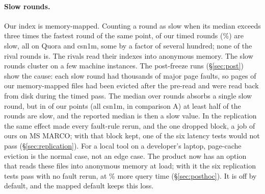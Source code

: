 \paragraph{Slow rounds.} Our index is memory-mapped. Counting a round as slow when its median exceeds
three times the fastest round of the same point,  of our  timed rounds
(\%) are slow, all on Quora and csn1m, some by a factor of several hundred; none of the
 rival rounds is. The rivals read their indexes into anonymous memory. The slow rounds
cluster on a few machine instances. The post-freeze runs (\S\ref{sec:post}) show the cause: each slow
round had thousands of major page faults, so pages of our memory-mapped files had been evicted after the
pre-read and were read back from disk during the timed pass. The median over rounds absorbs a single slow round, but in
 of our points (all csn1m, in comparison A) at least half of the rounds are slow, and the
reported median is then a slow value. In the replication the same effect made every fault-rule rerun, and
the one dropped block, a job of ours on MS MARCO; with that block kept, one of the six latency tests would not pass
(\S\ref{sec:replication}). For a local tool on a developer's laptop, page-cache eviction is the normal case, not an edge case. The product now has
an option that reads these files into anonymous memory at load; with it the six replication tests pass with no fault
rerun, at \% more query time (\S\ref{sec:posthoc}). It is off by default, and the mapped default keeps this loss.
